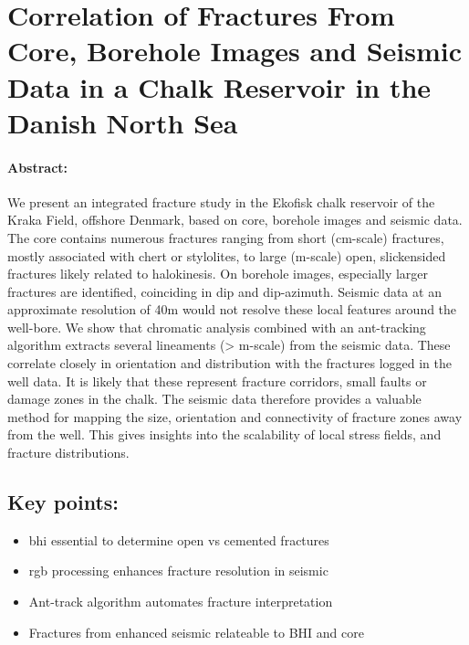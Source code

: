 \section{Correlation of Fractures From Core, Borehole Images and Seismic Data in a Chalk Reservoir in the Danish North Sea}
\label{sec:talaEAGE}
\paragraph{Abstract:} We present an integrated fracture study in the Ekofisk chalk reservoir of the Kraka Field, offshore Denmark, based on core, borehole images and seismic data. The core contains numerous fractures ranging from short (cm-scale) fractures, mostly associated with chert or stylolites, to large (m-scale) open, slickensided fractures likely related to halokinesis. On borehole images, especially larger fractures are identified, coinciding in dip and dip-azimuth. Seismic data at an approximate resolution of 40m would not resolve these local features around the well-bore. We show that chromatic analysis combined with an ant-tracking algorithm extracts several lineaments (> m-scale) from the seismic data. These correlate closely in orientation and distribution with the fractures logged in the well data. It is likely that these represent fracture corridors, small faults or damage zones in the chalk. The seismic data therefore provides a valuable method for mapping the size, orientation and connectivity of fracture zones away from the well. This gives insights into the scalability of local stress fields, and fracture distributions.

\subsection*{Key points:}
\begin{itemize}
    \item \acf{bhi} essential to determine open vs cemented fractures
    \item \acf{rgb} processing enhances fracture resolution in seismic
    \item Ant-track algorithm automates fracture interpretation
    \item Fractures from enhanced seismic relateable to BHI and core
\end{itemize}


{\vfill\hfill\newline{}}

